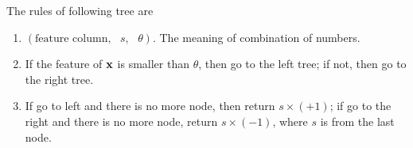 \documentclass[12pt]{article}
\newcommand{\ParTh}[1]{\left(#1\right)}
\newcommand{\BF}[1]{{\bf#1}}
\begin{document}
The rules of following tree are
\begin{enumerate}
	\item $\ParTh{\text{feature column},\text{ }s,\text{ }\theta}$. The meaning of combination of numbers.
	\item If the feature of $\BF{x}$ is smaller than $\theta$, then go to the left tree; if not, then go to the right tree.
	\item If go to left and there is no more node, then return $s\times\ParTh{+1}$; if go to the right and there is no more node, return $s\times\ParTh{-1}$, where $s$ is from the last node.
\end{enumerate}

\end{document}
